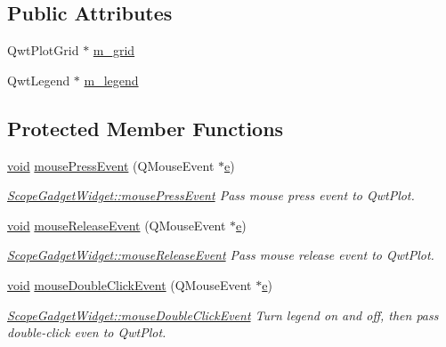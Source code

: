 \subsection*{\-Public \-Attributes}
\begin{DoxyCompactItemize}
\item 
\-Qwt\-Plot\-Grid $\ast$ \hyperlink{group___scope_plugin_gaccb00d0e9720797980ac9f03c545e756}{m\-\_\-grid}
\item 
\-Qwt\-Legend $\ast$ \hyperlink{group___scope_plugin_ga2ee6ef41538d48a8d6f653765bcb80a6}{m\-\_\-legend}
\end{DoxyCompactItemize}
\subsection*{\-Protected \-Member \-Functions}
\begin{DoxyCompactItemize}
\item 
\hyperlink{group___u_a_v_objects_plugin_ga444cf2ff3f0ecbe028adce838d373f5c}{void} \hyperlink{group___scope_plugin_ga11281413c7e13a020d557822db2eaae2}{mouse\-Press\-Event} (\-Q\-Mouse\-Event $\ast$\hyperlink{_o_p_plots_8m_a9425be9aab51621e317ba7ade564b570}{e})
\begin{DoxyCompactList}\small\item\em \hyperlink{group___scope_plugin_ga11281413c7e13a020d557822db2eaae2}{\-Scope\-Gadget\-Widget\-::mouse\-Press\-Event} \-Pass mouse press event to \-Qwt\-Plot. \end{DoxyCompactList}\item 
\hyperlink{group___u_a_v_objects_plugin_ga444cf2ff3f0ecbe028adce838d373f5c}{void} \hyperlink{group___scope_plugin_ga079408e64c98a63ff0459120988360e7}{mouse\-Release\-Event} (\-Q\-Mouse\-Event $\ast$\hyperlink{_o_p_plots_8m_a9425be9aab51621e317ba7ade564b570}{e})
\begin{DoxyCompactList}\small\item\em \hyperlink{group___scope_plugin_ga079408e64c98a63ff0459120988360e7}{\-Scope\-Gadget\-Widget\-::mouse\-Release\-Event} \-Pass mouse release event to \-Qwt\-Plot. \end{DoxyCompactList}\item 
\hyperlink{group___u_a_v_objects_plugin_ga444cf2ff3f0ecbe028adce838d373f5c}{void} \hyperlink{group___scope_plugin_ga6b657bc6aec409845f48f29bb6fb508d}{mouse\-Double\-Click\-Event} (\-Q\-Mouse\-Event $\ast$\hyperlink{_o_p_plots_8m_a9425be9aab51621e317ba7ade564b570}{e})
\begin{DoxyCompactList}\small\item\em \hyperlink{group___scope_plugin_ga6b657bc6aec409845f48f29bb6fb508d}{\-Scope\-Gadget\-Widget\-::mouse\-Double\-Click\-Event} \-Turn legend on and off, then pass double-\/click even to \-Qwt\-Plot. \end{DoxyCompactList}\item 

\end{DoxyCompactItemize}
